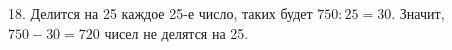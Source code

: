 18. Делится на 25 каждое 25-е число, таких будет $750:25=30.$ Значит, $750-30=720$ чисел не делятся на 25.\\
